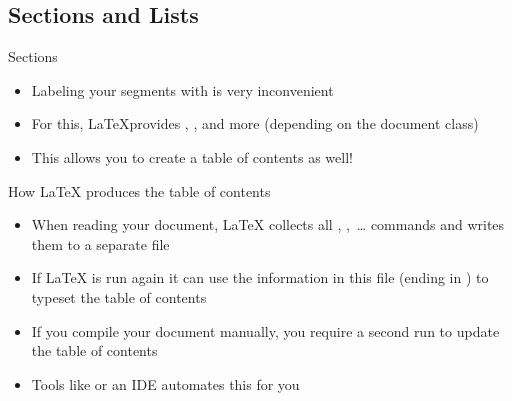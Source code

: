 \subsection{Sections and Lists}


\begin{frame}{Sections}
   \begin{itemize}
      \item Labeling your segments with \soldisablenumhl{} is very inconvenient
      \item For this, \LaTeX provides \blatex{\\section}, \blatex{\\subsection}, and more (depending on the document class)
      \item This allows you to create a table of contents as well!
   \end{itemize}
\end{frame}

\begin{frame}{How \LaTeX{} produces the table of contents}
   \begin{itemize}
      \itemsep8pt
      \item When reading your document, \LaTeX{} collects all \blatex{\\section}, \blatex{\\subsection},~\ldots{} commands and writes them to a separate file
      \item If \LaTeX{} is run again it can use the information in this file (ending in ) to typeset the table of contents
      \item If you compile your document manually, you require a second run to update the table of contents
      \item Tools like  or an IDE automates this for you
   \end{itemize}
\end{frame}

